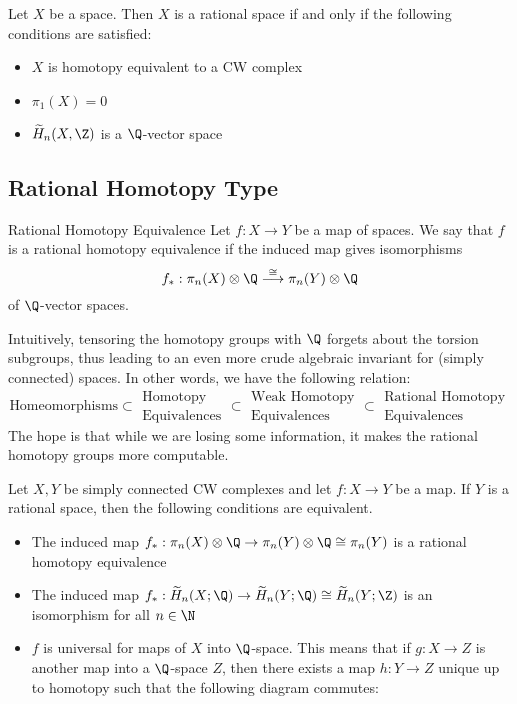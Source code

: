 \documentclass[a4paper]{article}
\begin{document}
\begin{thm}{}{} Let $X$ be a space. Then $X$ is a rational space if and only if the following conditions are satisfied: 
\begin{itemize}
\item $X$ is homotopy equivalent to a CW complex
\item $\pi_1(X)=0$
\item $\widetilde{H}_n(X,\Z)$ is a $\Q$-vector space
\end{itemize}
\end{thm}

\subsection{Rational Homotopy Type}
\begin{defn}{Rational Homotopy Equivalence}{} Let $f:X\to Y$ be a map of spaces. We say that $f$ is a rational homotopy equivalence if the induced map gives isomorphisms $$f_\ast:\pi_n(X)\otimes\Q\overset{\cong}{\longrightarrow}\pi_n(Y)\otimes\Q$$ of $\Q$-vector spaces. 
\end{defn}

Intuitively, tensoring the homotopy groups with $\Q$ forgets about the torsion subgroups, thus leading to an even more crude algebraic invariant for (simply connected) spaces. In other words, we have the following relation: $$\text{Homeomorphisms}\subset\substack{\text{Homotopy}\\\text{Equivalences}}\subset\substack{\text{Weak Homotopy}\\\text{Equivalences}}\subset\substack{\text{Rational Homotopy}\\\text{Equivalences}}$$ The hope is that while we are losing some information, it makes the rational homotopy groups more computable. 

\begin{thm}{}{} Let $X,Y$ be simply connected CW complexes and let $f:X\to Y$ be a map. If $Y$ is a rational space, then the following conditions are equivalent. 
\begin{itemize}
\item The induced map $f_\ast:\pi_n(X)\otimes\Q\to\pi_n(Y)\otimes\Q\cong\pi_n(Y)$ is a rational homotopy equivalence
\item The induced map $f_\ast:\widetilde{H}_n(X;\Q)\to\widetilde{H}_n(Y;\Q)\cong\widetilde{H}_n(Y;\Z)$ is an isomorphism for all $n\in\N$
\item $f$ is universal for maps of $X$ into $\Q$-space. This means that if $g:X\to Z$ is another map into a $\Q$-space $Z$, then there exists a map $h:Y\to Z$ unique up to homotopy such that the following diagram commutes: \\~\\
\\~\\
\end{itemize}
\end{thm}
\end{document}
